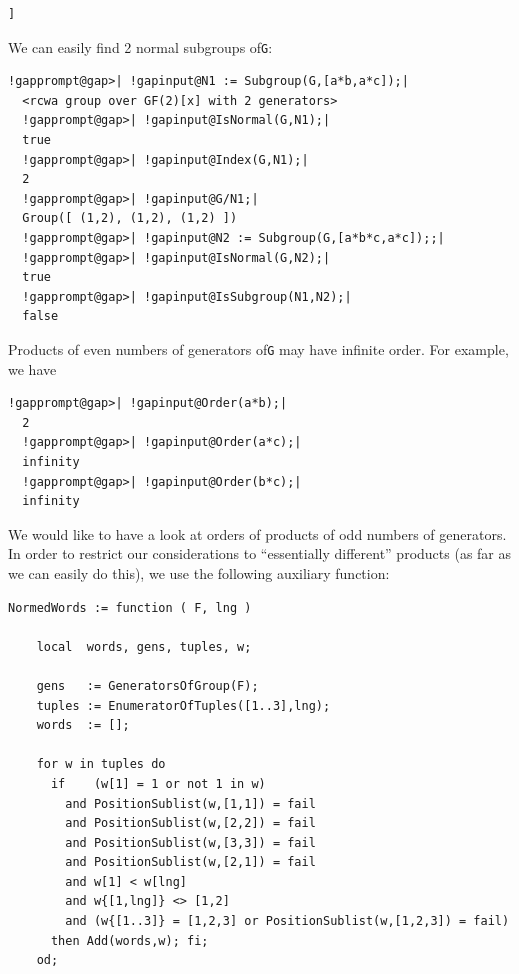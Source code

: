 \documentclass[a4paper,11pt]{report}
\begin{document}
{{\begin{Verbatim}[commandchars=!@A,fontsize=\small,frame=single,label=Example]
  ]
\end{Verbatim}
 We can easily find 2 normal subgroups of{\nobreakspace}\texttt{G}: 
\begin{Verbatim}[commandchars=!@|,fontsize=\small,frame=single,label=Example]
  !gapprompt@gap>| !gapinput@N1 := Subgroup(G,[a*b,a*c]);|
  <rcwa group over GF(2)[x] with 2 generators>
  !gapprompt@gap>| !gapinput@IsNormal(G,N1);|
  true
  !gapprompt@gap>| !gapinput@Index(G,N1);|
  2
  !gapprompt@gap>| !gapinput@G/N1;|
  Group([ (1,2), (1,2), (1,2) ])
  !gapprompt@gap>| !gapinput@N2 := Subgroup(G,[a*b*c,a*c]);;|
  !gapprompt@gap>| !gapinput@IsNormal(G,N2);|
  true
  !gapprompt@gap>| !gapinput@IsSubgroup(N1,N2);|
  false
\end{Verbatim}
 Products of even numbers of generators of{\nobreakspace}\texttt{G} may have infinite order. For example, we have 
\begin{Verbatim}[commandchars=!@|,fontsize=\small,frame=single,label=Example]
  !gapprompt@gap>| !gapinput@Order(a*b);|
  2
  !gapprompt@gap>| !gapinput@Order(a*c);|
  infinity
  !gapprompt@gap>| !gapinput@Order(b*c);|
  infinity
\end{Verbatim}
 We would like to have a look at orders of products of odd numbers of
generators. In order to restrict our considerations to ``essentially different'' products (as far as we can easily do this), we use the following auxiliary
function: 
\begin{Verbatim}[commandchars=!@|,fontsize=\small,frame=single,label=GAP code]
  NormedWords := function ( F, lng )
  
    local  words, gens, tuples, w;
  
    gens   := GeneratorsOfGroup(F);
    tuples := EnumeratorOfTuples([1..3],lng);
    words  := [];
  
    for w in tuples do
      if    (w[1] = 1 or not 1 in w)
        and PositionSublist(w,[1,1]) = fail
        and PositionSublist(w,[2,2]) = fail
        and PositionSublist(w,[3,3]) = fail
        and PositionSublist(w,[2,1]) = fail
        and w[1] < w[lng]
        and w{[1,lng]} <> [1,2]
        and (w{[1..3]} = [1,2,3] or PositionSublist(w,[1,2,3]) = fail)
      then Add(words,w); fi;
    od;
  

\end{Verbatim}}}
\end{document}
